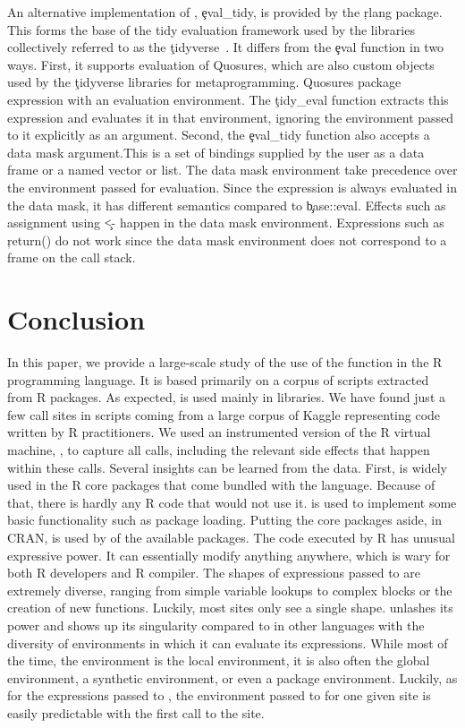 \documentclass[screen,acmsmall]{acmart}%
\begin{document}
An alternative implementation of \eval, \c{eval\_tidy}, is provided by the
\c{rlang} package. This forms the base of the tidy evaluation framework used by
the libraries collectively referred to as the \c{tidyverse}~\cite{tidyverse}. It
differs from the \c{eval} function in two ways. First, it supports evaluation of
Quosures, which are also custom objects used by the \c{tidyverse} libraries for
metaprogramming. Quosures package expression with an evaluation environment. The
\c{tidy\_eval} function extracts this expression and evaluates it in that
environment, ignoring the environment passed to it explicitly as an argument.
Second, the \c{eval\_tidy} function also accepts a data mask argument.This is a
set of bindings supplied by the user as a data frame or a named vector or list.
The data mask environment take precedence over the environment passed for
evaluation. Since the expression is always evaluated in the data mask, it has
different semantics compared to \c{base::eval}. Effects such as assignment using
\c{<-} happen in the data mask environment. Expressions such as \c{return()} do
not work since the data mask environment does not correspond to a frame on the
call stack.

\section{Conclusion}

In this paper, we provide a large-scale study of the use of the \eval function
in the R programming language. It is based primarily on a corpus of
\CranRunnableScripts scripts extracted from \CranPackages R packages. As
expected, \eval is used mainly in libraries. We have found just a few \eval
call sites in scripts coming from a large corpus of Kaggle representing code
written by R practitioners. We used an instrumented version of the R virtual
machine, \rdyntrace, to capture all \eval calls, including the relevant
side effects that happen within these calls. Several insights can be learned
from the data.
%
First, \eval is widely used in the R core packages that come bundled with the
language. Because of that, there is hardly any R code that would not use it.
\eval is used to implement some basic functionality such as package loading.
Putting the core packages aside, in CRAN, \eval is used by \PkgPackagesRatio of
the available \CranPackages packages.
%
The code executed by R \eval has unusual expressive power. It can essentially
modify anything anywhere, which is wary for both R developers and R compiler.
The shapes of expressions passed to \eval are extremely diverse, ranging from
simple variable lookups to complex blocks or the creation of new functions.
Luckily, most sites only see a single shape. \eval unlashes its power and shows
up its singularity compared to \eval in other languages with the diversity of
environments in which it can evaluate its expressions. While most of the time,
the \eval environment is the local environment, it is also often the global
environment, a synthetic environment, or even a package environment. Luckily, as
for the expressions passed to \eval, the environment passed to \eval for one
given site is easily predictable with the first call to the site.
\end{document}
